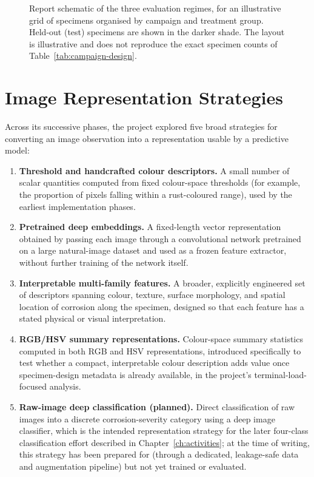 \begin{figure}[htbp]
\centering
\resizebox{0.8\textwidth}{!}{}
\caption{Report schematic of the three evaluation regimes, for an
illustrative grid of specimens organised by campaign and treatment group.
Held-out (test) specimens are shown in the darker shade. The layout is
illustrative and does not reproduce the exact specimen counts of
Table~\ref{tab:campaign-design}.}
\label{fig:eval-regimes}
\end{figure}

\section{Image Representation Strategies}
\label{sec:representation}

Across its successive phases, the project explored five broad strategies
for converting an image observation into a representation usable by a
predictive model:

\begin{enumerate}
\item[A.] \textbf{Threshold and handcrafted colour descriptors.} A small
number of scalar quantities computed from fixed colour-space thresholds
(for example, the proportion of pixels falling within a rust-coloured
range), used by the earliest implementation phases.
\item[B.] \textbf{Pretrained deep embeddings.} A fixed-length vector
representation obtained by passing each image through a convolutional
network pretrained on a large natural-image dataset and used as a frozen
feature extractor, without further training of the network itself.
\item[C.] \textbf{Interpretable multi-family features.} A broader,
explicitly engineered set of descriptors spanning colour, texture, surface
morphology, and spatial location of corrosion along the specimen, designed
so that each feature has a stated physical or visual interpretation.
\item[D.] \textbf{RGB/HSV summary representations.} Colour-space summary
statistics computed in both RGB and HSV representations, introduced
specifically to test whether a compact, interpretable colour description
adds value once specimen-design metadata is already available, in the
project's terminal-load-focused analysis.
\item[E.] \textbf{Raw-image deep classification (planned).} Direct
classification of raw images into a discrete corrosion-severity category
using a deep image classifier, which is the intended representation
strategy for the later four-class classification effort described in
Chapter~\ref{ch:activities}; at the time of writing, this strategy has been
prepared for (through a dedicated, leakage-safe data and augmentation
pipeline) but not yet trained or evaluated.
\end{enumerate}

